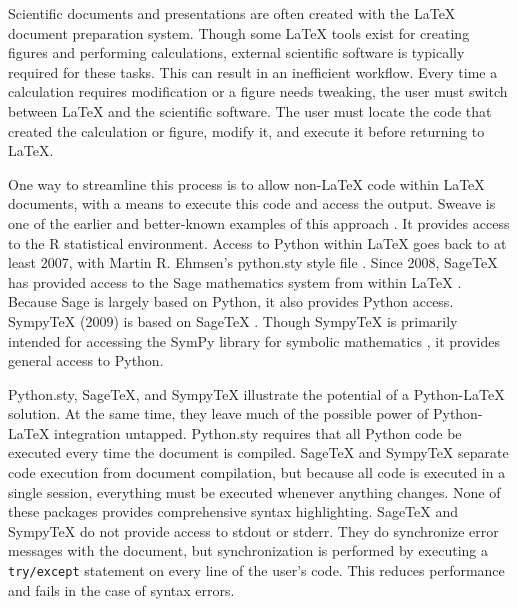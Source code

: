 \documentclass[letterpaper,compsoc,twoside]{IEEEtran}
\begin{document}
Scientific documents and presentations are often created with the LaTeX
document preparation system. Though some LaTeX tools exist for creating
figures and performing calculations, external scientific software is
typically required for these tasks. This can result in an inefficient
workflow. Every time a calculation requires modification or a figure
needs tweaking, the user must switch between LaTeX and the scientific
software. The user must locate the code that created the calculation or
figure, modify it, and execute it before returning to LaTeX.

One way to streamline this process is to allow non-LaTeX code within
LaTeX documents, with a means to execute this code and access the
output. Sweave is one of the earlier and better-known examples of this
approach \cite{Sweave}.  It provides access to the R statistical environment.
Access to Python within LaTeX goes back to at least
2007, with Martin R. Ehmsen's python.sty style file \cite{Ehmsen}. Since 2008,
SageTeX has provided access to the Sage mathematics system from within LaTeX
\cite{SageTeX}. Because Sage is largely based on Python, it also provides
Python access. SympyTeX (2009) is based on SageTeX \cite{SympyTeX}. Though
SympyTeX is primarily intended for accessing the SymPy library for
symbolic mathematics \cite{SymPy}, it provides general access to Python.

Python.sty, SageTeX, and SympyTeX illustrate the potential of a
Python-LaTeX solution. At the same time, they leave much of the
possible power of Python-LaTeX integration untapped.  Python.sty requires
that all Python code be executed every time the document is compiled.
SageTeX and SympyTeX separate code execution from document compilation,
but because all code is executed in a single session, everything must
be executed whenever anything changes.  None of these packages provides
comprehensive syntax highlighting.  SageTeX and SympyTeX do not
provide access to stdout or stderr.  They do synchronize error messages with
the document, but synchronization is performed by executing a \texttt{try/except}
statement on every line of the user's code.  This reduces performance
and fails in the case of syntax errors.
\end{document}
